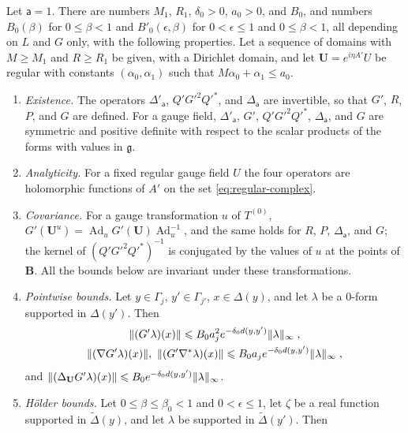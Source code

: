 \documentclass[11pt]{preprint}
\newcommand{\Ad}{\operatorname{Ad}}
\DeclarePairedDelimiter{\norm}{\lVert}{\rVert}
\numberwithin{equation}{section}
\begin{document}
\begin{theorem}\label{thm:propagators}
Let $\mathsf a = 1$. There are numbers $M_1$, $R_1$, $\delta_0 > 0$, $a_0 > 0$, and $B_0$, and numbers $B_0(\beta)$ for $0 \leqslant \beta < 1$ and $B'_0(\epsilon, \beta)$ for $0 < \epsilon \leqslant 1$ and $0 \leqslant \beta < 1$, all depending on $L$ and $G$ only, with the following properties. Let a sequence of domains with $M \geqslant M_1$ and $R \geqslant R_1$ be given, with a Dirichlet domain, and let $\mathbf U = e^{i\eta A'}U$ be regular with constants $(\alpha_0, \alpha_1)$ such that $M\alpha_0 + \alpha_1 \leqslant a_0$.
\begin{enumerate}[label=(\roman*)]
\item \emph{Existence.} The operators $\Delta'_{\mathsf a}$, $Q'G'^2Q'^*$, and $\Delta_{\mathsf a}$ are invertible, so that $G'$, $R$, $P$, and $G$ are defined. For a gauge field, $\Delta'_{\mathsf a}$, $G'$, $Q'G'^2Q'^*$, $\Delta_{\mathsf a}$, and $G$ are symmetric and positive definite with respect to the scalar products of the forms with values in $\mathfrak g$.
\item \emph{Analyticity.} For a fixed regular gauge field $U$ the four operators are holomorphic functions of $A'$ on the set \eqref{eq:regular-complex}.
\item \emph{Covariance.} For a gauge transformation $u$ of $T^{(0)}$, $G'(\mathbf U^u) = \Ad_uG'(\mathbf U)\Ad_u^{-1}$, and the same holds for $R$, $P$, $\Delta_{\mathsf a}$, and $G$; the kernel of $(Q'G'^2Q'^*)^{-1}$ is conjugated by the values of $u$ at the points of $\mathbf B$. All the bounds below are invariant under these transformations.
\item \emph{Pointwise bounds.} Let $y \in \Gamma_j$, $y' \in \Gamma_{j'}$, $x \in \Delta(y)$, and let $\lambda$ be a $0$-form supported in $\Delta(y')$. Then
\begin{equation}\label{eq:propagator-bound}
\begin{gathered}
    \norm{(G'\lambda)(x)} \leqslant B_0a_j^2e^{-\delta_0d(y, y')}\norm\lambda_\infty\;,\\
    \norm{(\nabla G'\lambda)(x)},\ \norm{(G'\nabla^*\lambda)(x)} \leqslant B_0a_je^{-\delta_0d(y, y')}\norm\lambda_\infty\;,
\end{gathered}
\end{equation}
and $\norm{(\Delta_{\mathbf U}G'\lambda)(x)} \leqslant B_0e^{-\delta_0d(y, y')}\norm\lambda_\infty$.
\item \emph{H\"older bounds.} Let $0 \leqslant \beta \leqslant \beta_0 < 1$ and $0 < \epsilon \leqslant 1$, let $\zeta$ be a real function supported in $\tilde\Delta(y)$, and let $\lambda$ be supported in $\tilde\Delta(y')$. Then

\end{enumerate}
\end{theorem}
\end{document}

